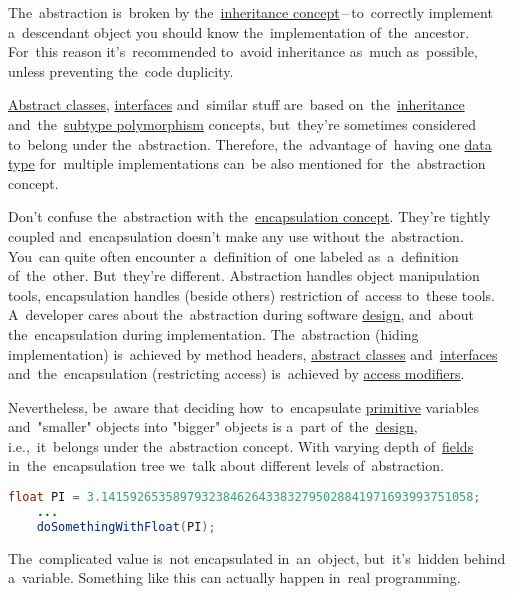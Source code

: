 \warning The~abstraction is~broken by the~\hyperref[inheritance]{inheritance concept}\,--\,to~correctly implement a~descendant object you should know the~implementation of~the~ancestor. For~this reason it's~recommended to~avoid inheritance as~much as~possible, unless preventing the~code duplicity.

\warning \hyperref[javaabstractclasses]{Abstract classes}, \hyperref[javainterfaces]{interfaces} and~similar stuff are~based on~the~\hyperref[inheritance]{inheritance} and~the~\hyperref[polymorphism]{subtype polymorphism} concepts, but~they're sometimes considered to~belong under the~abstraction. Therefore, the~advantage of~having one \hyperref[datatypes]{data type} for~multiple implementations can~be also mentioned for~the~abstraction concept.

\warning Don't confuse the~abstraction with the~\hyperref[encapsulation]{encapsulation concept}. They're tightly coupled and~encapsulation doesn't make any use without the~abstraction. You~can quite often encounter a~definition of~one labeled as~a~definition of~the~other. But~they're different. Abstraction handles object manipulation tools, encapsulation handles (beside others) restriction of~access to~these tools. A~developer cares about the~abstraction during software \hyperref[architecturedesign]{design}, and~about the~encapsulation during implementation. The~abstraction (hiding implementation) is~achieved by method headers, \hyperref[javaabstractclasses]{abstract classes} and~\hyperref[javainterfaces]{interfaces} and~the~encapsulation (restricting access) is~achieved by \hyperref[javaaccessmodifiers]{access modifiers}.

Nevertheless, be~aware that deciding how~to~encapsulate \hyperref[javadatatypes]{primitive} variables and~"smaller" objects into "bigger" objects is a~part of~the~\hyperref[architecturedesign]{design}, i.e.,~it~belongs under the~abstraction concept. With varying depth of~\hyperref[variablefieldproperty]{fields} in~the~encapsulation tree we~talk about different levels of~abstraction.

\begin{lstlisting}[language=Java]
    float PI = 3.1415926535897932384626433832795028841971693993751058;
    ...
    doSomethingWithFloat(PI);
\end{lstlisting}

\noindent The~complicated value is~not encapsulated in~an~object, but~it's~hidden behind a~variable. Something like this can actually happen in~real programming.
\newpage


